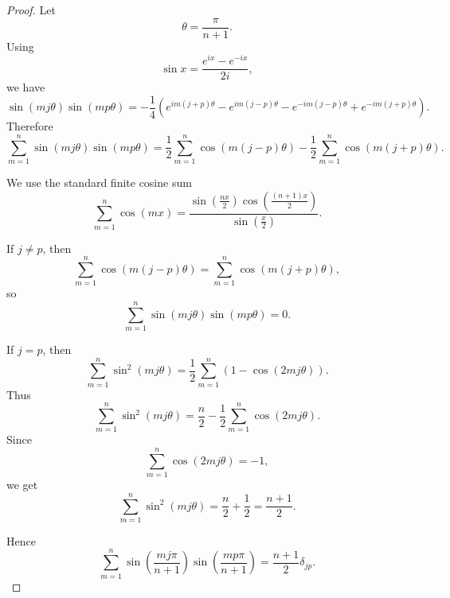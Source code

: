 \documentclass{ctexart}
\begin{document}
\begin{proof}
  Let
  \[
    \theta=\frac{\pi}{n+1}.
  \]
  Using
  \[
    \sin x=\frac{e^{ix}-e^{-ix}}{2i},
  \]
  we have
  \[
    \sin(mj\theta)\sin(mp\theta)
    =
    -\frac14
    \left(
      e^{im(j+p)\theta}
      -e^{im(j-p)\theta}
      -e^{-im(j-p)\theta}
      +e^{-im(j+p)\theta}
    \right).
  \]
  Therefore
  \[
    \sum_{m=1}^{n}\sin(mj\theta)\sin(mp\theta)
    =
    \frac12
    \sum_{m=1}^{n}\cos(m(j-p)\theta)
    -
    \frac12
    \sum_{m=1}^{n}\cos(m(j+p)\theta).
  \]

  We use the standard finite cosine sum
  \[
    \sum_{m=1}^{n}\cos(mx)
    =
    \frac{\sin\left(\frac{nx}{2}\right)
    \cos\left(\frac{(n+1)x}{2}\right)}
    {\sin\left(\frac{x}{2}\right)}.
  \]

  If $j\neq p$, then
  \[
    \sum_{m=1}^{n}\cos(m(j-p)\theta)
    =
    \sum_{m=1}^{n}\cos(m(j+p)\theta),
  \]
  so
  \[
    \sum_{m=1}^{n}\sin(mj\theta)\sin(mp\theta)=0.
  \]

  If $j=p$, then
  \[
    \sum_{m=1}^{n}\sin^2(mj\theta)
    =
    \frac12\sum_{m=1}^{n}
    \left(1-\cos(2mj\theta)\right).
  \]
  Thus
  \[
    \sum_{m=1}^{n}\sin^2(mj\theta)
    =
    \frac n2
    -
    \frac12
    \sum_{m=1}^{n}\cos(2mj\theta).
  \]
  Since
  \[
    \sum_{m=1}^{n}\cos(2mj\theta)=-1,
  \]
  we get
  \[
    \sum_{m=1}^{n}\sin^2(mj\theta)
    =
    \frac n2+\frac12
    =
    \frac{n+1}{2}.
  \]

  Hence
  \[
    \sum_{m=1}^{n}
    \sin\left(\frac{mj\pi}{n+1}\right)
    \sin\left(\frac{mp\pi}{n+1}\right)
    =
    \frac{n+1}{2}\delta_{jp}.
  \]
\end{proof}
\end{document}
